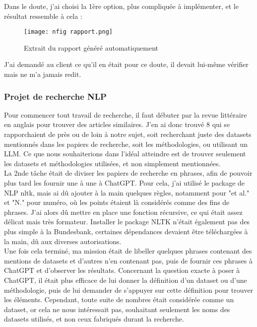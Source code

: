 Dans le doute, j'ai choisi la 1ère option, plus compliquée à implémenter, et le résultat ressemble à cela :

\begin{figure}[H]
    \centering
    \texttt{[image: nfig rapport.png]}
    \caption{Extrait du rapport généré automatiquement}
\end{figure}

J'ai demandé au client ce qu'il en était pour ce doute, il devait lui-même vérifier mais ne m'a jamais redit.

\subsubsection{Projet de recherche NLP}

Pour commencer tout travail de recherche, il faut débuter par la revue littéraire en anglais pour trouver des articles similaires. 
J'en ai donc trouvé 8 qui se rapporchaient de près ou de loin à notre sujet, soit recherchant juste des datasets mentionnés dans les papiers de recherche, soit les méthodologies, ou utilisant un LLM.
Ce que nous souhaiterions dans l'idéal atteindre est de trouver seulement les datasets et méthodologies utilisées, et non simplement mentionnées.
\\

La 2nde tâche était de diviser les papiers de recherche en phrases, afin de pouvoir plus tard les fournir une à une à ChatGPT. 
Pour cela, j'ai utilisé le package de NLP nltk, mais ai dû ajouter à la main quelques règles, notamment pour "et al." et "N." pour numéro, où les points étaient là considérés comme des fins de phrases.
J'ai alors dû mettre en place une fonction récursive, ce qui était assez délicat mais très formateur.
Installer le package NLTK n'était également pas des plus simple à la Bundesbank, certaines dépendances devaient être téléchargées à la main, dû aux diverses autorisations.
\\

Une fois cela terminé, ma mission était de libeller quelques phrases contenant des mentions de datasets et d'autres n'en contenant pas, puis de fournir ces phrases à ChatGPT et d'observer les résultats.
Concernant la question exacte à poser à ChatGPT, il était plus efficace de lui donner la définition d'un dataset ou d'une méthodologie, puis de lui demander de s'appuyer sur cette définition pour trouver les éléments.
Cependant, toute suite de nombres était considérée comme un dataset, or cela ne nous intéressait pas, souhaitant seulement les noms des datasets utilisés, et non ceux fabriqués durant la recherche.

